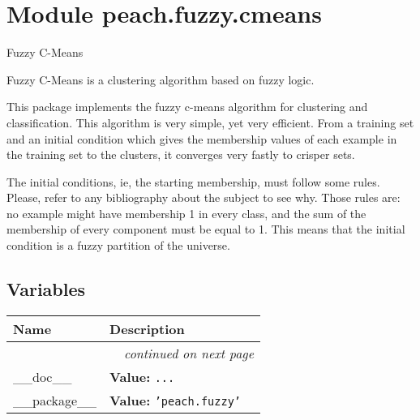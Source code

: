 %
%
%


\section{Module peach.fuzzy.cmeans}

    \label{peach:fuzzy:cmeans}

Fuzzy C-Means

Fuzzy C-Means is a clustering algorithm based on fuzzy logic.

This package implements the fuzzy c-means algorithm for clustering and
classification. This algorithm is very simple, yet very efficient. From a
training set and an initial condition which gives the membership values of each
example in the training set to the clusters, it converges very fastly to crisper
sets.

The initial conditions, ie, the starting membership, must follow some rules.
Please, refer to any bibliography about the subject to see why. Those rules are:
no example might have membership 1 in every class, and the sum of the membership
of every component must be equal to 1. This means that the initial condition is
a fuzzy partition of the universe.


  \subsection{Variables}

    \vspace{-1cm}
\hspace{\varindent}\begin{longtable}{|p{\varnamewidth}|p{\vardescrwidth}|l}
\cline{1-2}
\cline{1-2} \centering \textbf{Name} & \centering \textbf{Description}& \\
\cline{1-2}
\endhead\cline{1-2}\multicolumn{3}{r}{\small\textit{continued on next page}}\\\endfoot\cline{1-2}
\endlastfoot\raggedright \_\-\_\-d\-o\-c\-\_\-\_\- & \raggedright \textbf{Value:} 
{\tt \texttt{...}}&\\
\cline{1-2}
\raggedright \_\-\_\-p\-a\-c\-k\-a\-g\-e\-\_\-\_\- & \raggedright \textbf{Value:} 
{\tt \texttt{'}\texttt{peach.fuzzy}\texttt{'}}&\\
\cline{1-2}
\end{longtable}


